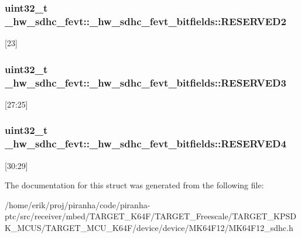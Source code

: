 \subsubsection[{\texorpdfstring{R\+E\+S\+E\+R\+V\+E\+D2}{RESERVED2}}]{\setlength{\rightskip}{0pt plus 5cm}uint32\+\_\+t \+\_\+hw\+\_\+sdhc\+\_\+fevt\+::\+\_\+hw\+\_\+sdhc\+\_\+fevt\+\_\+bitfields\+::\+R\+E\+S\+E\+R\+V\+E\+D2}\hypertarget{struct__hw__sdhc__fevt_1_1__hw__sdhc__fevt__bitfields_ad8d6b26d1caf73aa23c6af5c191b54f2}{}\label{struct__hw__sdhc__fevt_1_1__hw__sdhc__fevt__bitfields_ad8d6b26d1caf73aa23c6af5c191b54f2}
\mbox{[}23\mbox{]} 
\subsubsection[{\texorpdfstring{R\+E\+S\+E\+R\+V\+E\+D3}{RESERVED3}}]{\setlength{\rightskip}{0pt plus 5cm}uint32\+\_\+t \+\_\+hw\+\_\+sdhc\+\_\+fevt\+::\+\_\+hw\+\_\+sdhc\+\_\+fevt\+\_\+bitfields\+::\+R\+E\+S\+E\+R\+V\+E\+D3}\hypertarget{struct__hw__sdhc__fevt_1_1__hw__sdhc__fevt__bitfields_a8efcdbec8a0c2e0d7b3c37d8d7ef4ab6}{}\label{struct__hw__sdhc__fevt_1_1__hw__sdhc__fevt__bitfields_a8efcdbec8a0c2e0d7b3c37d8d7ef4ab6}
\mbox{[}27\+:25\mbox{]} 
\subsubsection[{\texorpdfstring{R\+E\+S\+E\+R\+V\+E\+D4}{RESERVED4}}]{\setlength{\rightskip}{0pt plus 5cm}uint32\+\_\+t \+\_\+hw\+\_\+sdhc\+\_\+fevt\+::\+\_\+hw\+\_\+sdhc\+\_\+fevt\+\_\+bitfields\+::\+R\+E\+S\+E\+R\+V\+E\+D4}\hypertarget{struct__hw__sdhc__fevt_1_1__hw__sdhc__fevt__bitfields_a7d00635c7e52a9cd1342842201f917dc}{}\label{struct__hw__sdhc__fevt_1_1__hw__sdhc__fevt__bitfields_a7d00635c7e52a9cd1342842201f917dc}
\mbox{[}30\+:29\mbox{]} 

The documentation for this struct was generated from the following file\+:\begin{DoxyCompactItemize}
\item 
/home/erik/proj/piranha/code/piranha-\/ptc/src/receiver/mbed/\+T\+A\+R\+G\+E\+T\+\_\+\+K64\+F/\+T\+A\+R\+G\+E\+T\+\_\+\+Freescale/\+T\+A\+R\+G\+E\+T\+\_\+\+K\+P\+S\+D\+K\+\_\+\+M\+C\+U\+S/\+T\+A\+R\+G\+E\+T\+\_\+\+M\+C\+U\+\_\+\+K64\+F/device/device/\+M\+K64\+F12/M\+K64\+F12\+\_\+sdhc.\+h\end{DoxyCompactItemize}
